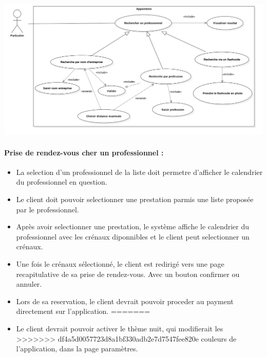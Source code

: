 \documentclass{article}
\begin{document}
\begin{itemize}
\begin{itemize}
\includegraphics[scale=0.3]{ShematDiagrammes/useCaseRecherchePro.jpg}

\end{itemize}

\paragraph{Prise de rendez-vous cher un professionnel :}
\begin{itemize}

\item La selection d'un
  professionnel de la liste doit permetre d'afficher le
  calendrier du professionnel en question.
\item Le client doit pouvoir selectionner une prestation parmis une liste
  proposée par le professionnel.
\item Après avoir selectionner une prestation, le système affiche le
  calendrier du professionnel avec les crénaux diponnibles et le
  client peut selectionner un crénaux.
\item Une fois le crénaux sélectionné, le client est redirigé vers
    une page recapitulative de sa prise de rendez-vous. Avec un bouton
    confirmer ou annuler.
\item Lors de sa reservation, le client devrait pouvoir proceder au
  payment directement sur l'application.
=======
\item Le client devrait pouvoir activer le thème nuit, qui modifierait les
>>>>>>> df4a5d0057723d8a1bf330adb2e7d7547fee820e
  couleurs de l'application, dans la page paramètres.
\end{itemize}

\end{itemize}
\end{document}
